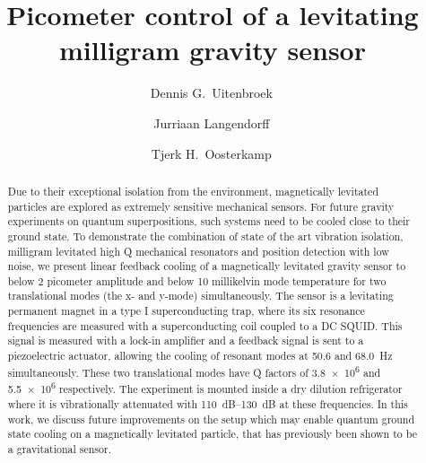 \documentclass[%
reprint,
superscriptaddress,
 prl,
 amsmath,
 amssymb,
 aps,
 longbibliography
]{revtex4-2}
\newcommand{\MYhref}[3][blue]{\href{#2}{\color{#1}{#3}}}%
\begin{document}
\newcommand{\titleinfo}{\boldmath Picometer control of a levitating milligram gravity sensor}
\newcommand{\authorinfo}{Dennis G.~Uitenbroek, Jurriaan Langendorff, and Tjerk H.~Oosterkamp}

\title{\titleinfo}

\author{Dennis G.~Uitenbroek\,\MYhref[orcid-green]{https://orcid.org/0009-0008-3425-6406}{\faOrcid}}

\author{Jurriaan Langendorff\,\MYhref[orcid-green]{https://orcid.org/}{\faOrcid}}

\author{Tjerk H.~Oosterkamp\,\MYhref[orcid-green]{https://orcid.org/0000-0001-6855-5190}{\faOrcid}}



\begin{abstract}
\noindent
Due to their exceptional isolation from the environment, magnetically levitated particles are explored as extremely sensitive mechanical sensors. For future gravity experiments on quantum superpositions, such systems need to be cooled close to their ground state. To demonstrate the combination of state of the art vibration isolation, milligram levitated high Q mechanical resonators and position detection with low noise, we present linear feedback cooling of a magnetically levitated gravity sensor to below 2 picometer amplitude and below 10 millikelvin mode temperature for two translational modes (the x- and y-mode) simultaneously. The sensor is a levitating permanent magnet in a type I superconducting trap, where its six resonance frequencies are measured with a superconducting coil coupled to a DC SQUID.  This signal is measured with a lock-in amplifier and a feedback signal is sent to a piezoelectric actuator, allowing the cooling of resonant modes  at \SI{50.6}{} and \SI{68.0}{Hz} simultaneously. These two translational modes have Q factors of \SI{3.8e6}{} and \SI{5.5e6}{} respectively. The experiment is mounted inside a dry dilution refrigerator where it is vibrationally attenuated with \SIrange{110}{130}{dB} at these frequencies. In this work, we discuss future improvements on the setup which may enable quantum ground state cooling on a magnetically levitated particle, that has previously been shown to be a gravitational sensor.
\end{abstract}
\maketitle
\end{document}

